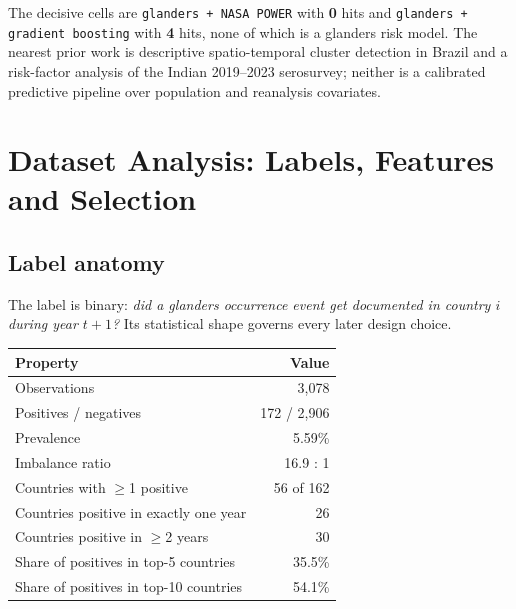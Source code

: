 \documentclass[11pt]{article}
\begin{document}
\noindent
The decisive cells are \texttt{glanders + NASA POWER} with
\textbf{0} hits and
\texttt{glanders + gradient boosting} with
\textbf{4} hits, none of which is a glanders risk
model. The nearest prior work is descriptive spatio-temporal cluster detection in Brazil and a
risk-factor analysis of the Indian 2019--2023 serosurvey; neither is a calibrated predictive
pipeline over population and reanalysis covariates.

\section{Dataset Analysis: Labels, Features and Selection}
\label{sec:labels}

\subsection{Label anatomy}

The label is binary: \emph{did a glanders occurrence event get documented in country $i$ during
year $t+1$?} Its statistical shape governs every later design choice.

\begin{center}
\small
\begin{tabular}{@{}lr@{}}
\toprule
\textbf{Property} & \textbf{Value} \\
\midrule
Observations & 3,078 \\
Positives / negatives & 172 / 2,906 \\
Prevalence & 5.59\% \\
Imbalance ratio & 16.9 : 1 \\
Countries with $\geq$1 positive & 56 of 162 \\
Countries positive in exactly one year & 26 \\
Countries positive in $\geq$2 years & 30 \\
Share of positives in top-5 countries & 35.5\% \\
Share of positives in top-10 countries & 54.1\% \\
\bottomrule
\end{tabular}
\end{center}
\end{document}
